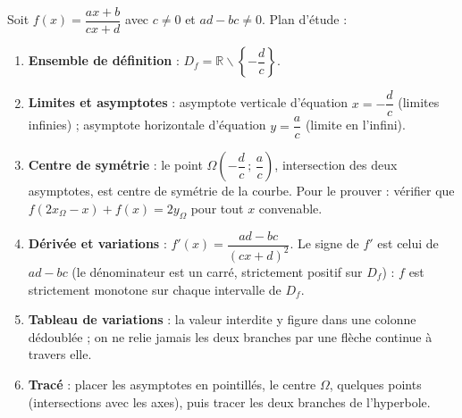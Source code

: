 \documentclass[11pt]{article}
\def\setminus{\mathbin{\backslash}}\let\smallsetminus\setminus
\begin{document}
\begin{methode}
Soit $f(x)=\dfrac{ax+b}{cx+d}$ avec $c\neq 0$ et $ad-bc\neq 0$. Plan d'étude :
\begin{enumerate}
\item \textbf{Ensemble de définition} : $D_f=\mathbb{R}\setminus\left\{-\dfrac{d}{c}\right\}$.
\item \textbf{Limites et asymptotes} : asymptote verticale d'équation $x=-\dfrac{d}{c}$ (limites infinies) ; asymptote horizontale d'équation $y=\dfrac{a}{c}$ (limite en l'infini).
\item \textbf{Centre de symétrie} : le point $\Omega\left(-\dfrac{d}{c}\,;\,\dfrac{a}{c}\right)$, intersection des deux asymptotes, est centre de symétrie de la courbe. Pour le prouver : vérifier que $f(2x_\Omega-x)+f(x)=2y_\Omega$ pour tout $x$ convenable.
\item \textbf{Dérivée et variations} : $f'(x)=\dfrac{ad-bc}{(cx+d)^2}$. Le signe de $f'$ est celui de $ad-bc$ (le dénominateur est un carré, strictement positif sur $D_f$) : $f$ est strictement monotone sur chaque intervalle de $D_f$.
\item \textbf{Tableau de variations} : la valeur interdite y figure dans une colonne dédoublée ; on ne relie jamais les deux branches par une flèche continue à travers elle.
\item \textbf{Tracé} : placer les asymptotes en pointillés, le centre $\Omega$, quelques points (intersections avec les axes), puis tracer les deux branches de l'hyperbole.
\end{enumerate}
\end{methode}
\end{document}
